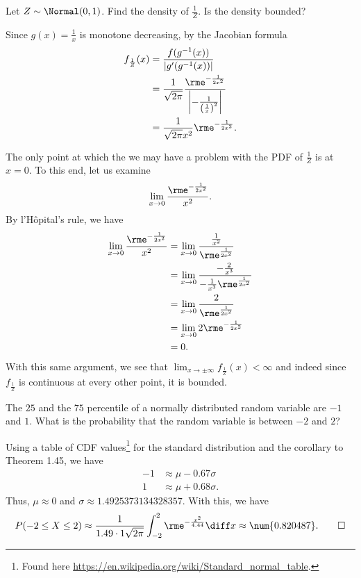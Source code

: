 \begin{problem}[Handout 13, \# 21]
  Let \(Z\sim\Normal(0,1)\). Find the density of \(\frac{1}{Z}\). Is the
  density bounded?
\end{problem}
\begin{solution}
  Since \(g(x)=\frac{1}{x}\) is monotone decreasing, by the Jacobian
  formula
  \begin{align*}
    f_{\frac{1}{Z}}(x)
    &=\frac{f(g^{-1}(x))}{|g'(g^{-1}(x))|}\\
    &=\frac{1}{\sqrt{2\pi}}
      \frac{\rme^{-\frac{1}{2x^2}}}{\left|-\frac{1}{\left(\frac{1}{x}\right)^2}
      \right|}\\
    &=\frac{1}{\sqrt{2\pi}x^2}\rme^{-\frac{1}{2x^2}}.
  \end{align*}

  The only point at which the we may have a problem with the PDF of
  \(\frac{1}{Z}\) is at \(x=0\). To this end, let us examine
  \[
    \lim_{x\to 0}\frac{\rme^{-\frac{1}{2x^2}}}{x^2}.
  \]
  By l'Hôpital's rule, we have
  \begin{align*}
    \lim_{x\to 0}\frac{\rme^{-\frac{1}{2x^2}}}{x^2}
    &=\lim_{x\to 0}\frac{\frac{1}{x^2}}{\rme^{\frac{1}{2x^2}}}\\
    &=\lim_{x\to 0}\frac{-\frac{2}{x^3}}{-\frac{1}{x^3}\rme^{\frac{1}{2x^2}}}\\
    &=\lim_{x\to 0}\frac{2}{\rme^{\frac{1}{2x^2}}}\\
    &=\lim_{x\to 0} 2\rme^{-\frac{1}{2x^2}}\\
    &=0.
  \end{align*}
  With this same argument, we see that \(\lim_{x\to\pm\infty}
  f_{\frac{1}{Z}}(x)<\infty\) and indeed since \(f_{\frac{1}{Z}}\) is
  continuous at every other point, it is bounded.
\end{solution}
\newpage

\begin{problem}[Handout 13, \# 22]
  The \(25\) and the \(75\) percentile of a
  normally distributed random variable are \(-1\) and \(1\). What is the
  probability that the random variable is between \(-2\) and \(2\)?
\end{problem}
\begin{solution}
  Using a table of CDF values\footnote{Found here
    \url{https://en.wikipedia.org/wiki/Standard_normal_table}.} for the
  standard distribution and the corollary to Theorem 1.45, we have
  \begin{align*}
    -1&\approx \mu-0.67\sigma\\
    1&\approx \mu+0.68\sigma.
  \end{align*}
  Thus, \(\mu\approx 0\) and
  \(\sigma\approx\num{1.4925373134328357}\). With this, we have
  \[
    P(-2\leq X\leq 2)
    \approx\frac{1}{1.49\cdot1\sqrt{2\pi}}\int_{-2}^2\rme^{-\frac{x^2}{4.44}}\diff
    x
    \approx\num{0.820487}.\qedhere
  \]
\end{solution}

